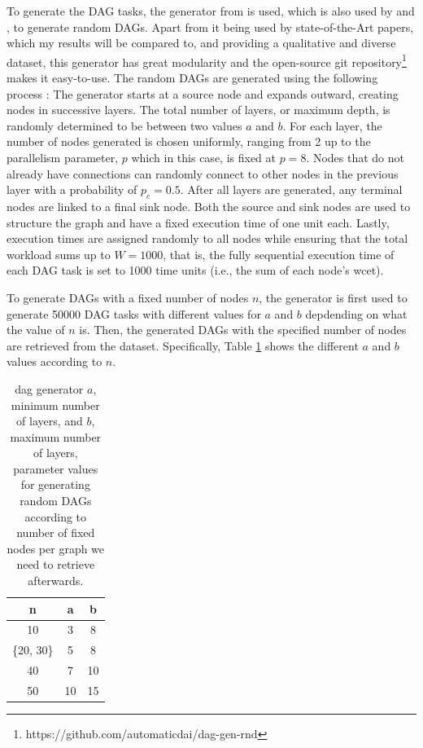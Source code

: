 To generate the DAG tasks, the generator from \citet{zhao2020DAGsched} is used, which is also used by 
\citet{Lee2021GlobalDagSchedDRL} and \cite{Zhao2022DAGsched}, to generate
random DAGs.
Apart from it being used by state-of-the-Art papers, which my results will be compared to,
and providing a qualitative and diverse dataset,
this generator has great modularity and the open-source git repository\footnote{https://github.com/automaticdai/dag-gen-rnd} 
makes it easy-to-use.
The random DAGs are generated using the following process :
The generator starts at a source node and expands outward, 
creating nodes in successive layers. The total number of layers, 
or maximum depth, is randomly determined to be between two values $a$ and $b$.
For each layer, the number of nodes generated is chosen uniformly, 
ranging from 2 up to the parallelism parameter, $p$ which in this case, 
is fixed at $p=8$. Nodes that do 
not already have connections can randomly connect to other nodes in 
the previous layer with a probability of $p_c=0.5$. After all layers 
are generated, any terminal nodes are linked to a final sink node. 
Both the source and sink nodes are used to structure the graph and 
have a fixed execution time of one unit each. Lastly, 
execution times are assigned randomly to all nodes while ensuring 
that the total workload sums up to $W = 1000$\cite{zhao2020DAGsched},
that is, the fully sequential execution time of each DAG task is set to 1000 time units (i.e., the sum of each node's wcet).

To generate DAGs with a fixed number of nodes $n$, 
the generator is first used to generate 50000 DAG tasks
with different values for $a$ and $b$ depdending on what 
the value of $n$ is. Then, the generated DAGs with 
the specified number of nodes are retrieved from the dataset.
Specifically, Table \ref{tab:layer_num_minmax} 
shows the different $a$ and $b$ values according to $n$.

\begin{table}
    \centering
    \begin{tabular}{|c|c|c|}    
        \hline
        \textbf{n} & \textbf{a} & \textbf{b} \\
        \hline
        10 & 3 & 8 \\
        \hline
        \{20, 30\} & 5 & 8 \\
        \hline
        40 & 7 & 10 \\
        \hline
        50 & 10 & 15 \\
        \hline
    \end{tabular}
    \caption{dag generator $a$, minimum number of layers, and $b$, maximum
    number of layers, parameter values for generating 
    random DAGs according to number of fixed nodes per graph we need to retrieve afterwards.}
    \label{tab:layer_num_minmax}
\end{table}

